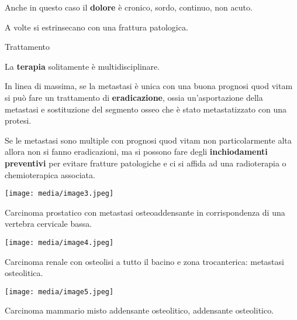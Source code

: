 Anche in questo caso il \textbf{dolore} è cronico, sordo, continuo, non
acuto.

A volte si estrinsecano con una frattura patologica.

Trattamento

La \textbf{terapia} solitamente è multidisciplinare.

In linea di massima, se la metastasi è unica con una buona prognosi quod
vitam si può fare un trattamento di \textbf{eradicazione}, ossia
un'asportazione della metastasi e sostituzione del segmento osseo che è
stato metastatizzato con una protesi.

Se le metastasi sono multiple con prognosi quod vitam non
particolarmente alta allora non si fanno eradicazioni, ma si possono
fare degli \textbf{inchiodamenti preventivi} per evitare fratture
patologiche e ci si affida ad una radioterapia o chemioterapica
associata.

\texttt{[image: media/image3.jpeg]}

Carcinoma prostatico con metastasi osteoaddensante in corrispondenza di
una vertebra cervicale bassa.

\texttt{[image: media/image4.jpeg]}

Carcinoma renale con osteolisi a tutto il bacino e zona trocanterica:
metastasi osteolitica.

\texttt{[image: media/image5.jpeg]}

Carcinoma mammario misto addensante osteolitico, addensante osteolitico.